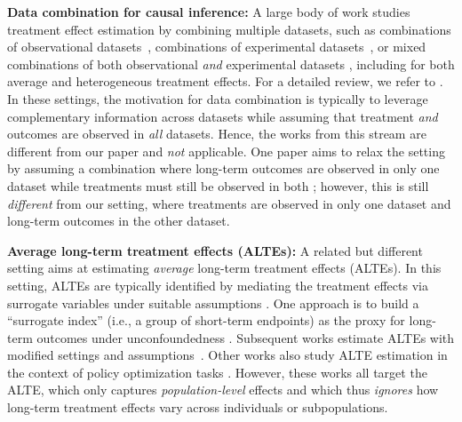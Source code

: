 \documentclass{article}
\theoremstyle{plain}
\theoremstyle{definition}
\theoremstyle{remark}
\newcommand{\1}{\mathds{1}}                %
\begin{document}
\textbf{Data combination for causal inference:} A large body of work studies treatment effect estimation by combining multiple datasets, such as combinations of observational datasets~\citep[e.g.,][]{Yang.2020, Yuxin.2025}, combinations of experimental datasets~\citep[e.g.,][]{Debray.2015, Tan.2022, Brantner.2024-comparison}, or mixed combinations of both observational \textit{and} experimental datasets \citep[e.g.,][]{Hatt.2022, Wu.2022-integrative, Brantner.2023, Yao.2024combining, Yuxin.2025, parikh.2025double, Chen.2025, Cai.2025-Individual, Chen.2025-sequential}
, including for both average and heterogeneous treatment effects. For a detailed review, we refer to \citet{Colnet.2024}.
In these settings, the motivation for data combination is typically to leverage complementary information across datasets while assuming that treatment \textit{and} outcomes are observed in \textit{all} datasets. Hence, the works from this stream are different from our paper and \textit{not} applicable. One paper aims to relax the setting by assuming a combination where long-term outcomes are observed in only one dataset while treatments must still be observed in both \cite{Cai.2025-Individual}; however, this is still \textit{different} from our setting, where treatments are observed in only one dataset and long-term outcomes in the other dataset.


\textbf{Average long-term treatment effects (ALTEs):} A related but different setting aims at estimating \textit{average} long-term treatment effects (ALTEs). In this setting, ALTEs are typically identified by mediating the treatment effects via surrogate variables under suitable assumptions \citep[e.g.,][]{Prentice.1989, Frangakis.2002, Lauritzen.2004}. One approach is to build a ``surrogate index'' (i.e., a group of short-term endpoints) as the proxy for long-term outcomes under unconfoundedness \citep{Athey.2025, Chen.2023}. Subsequent works estimate ALTEs with modified settings and assumptions~\citep[e.g.,][]{Athey.2020a, Ghassami.2022, Goffrier.2023, Obradovic.2024,Cai.2024-latent, Imbens.2025}. Other works also study ALTE estimation in the context of policy optimization tasks \citep[e.g.,][]{McDonald.2023, Park.2024bracketing, Yang.2024-Targeting, Yang.2024-LearningTheOptimalPolicy, Wang.2024, Saito.2024LOPE}. However, these works all target the ALTE, which only captures \textit{population-level} effects and which thus \textit{ignores} how long-term treatment effects vary across individuals or subpopulations. %
\end{document}
